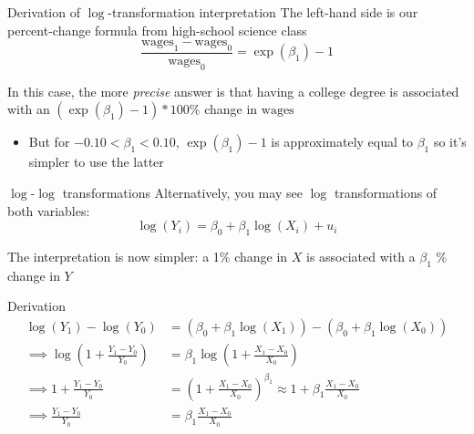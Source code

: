 \documentclass[aspectratio=169,t,11pt,table]{beamer}
\begin{document}
\begin{frame}{Derivation of $\log$-transformation interpretation}
  The left-hand side is our percent-change formula from high-school science class
  $$
    \frac{\text{wages}_1 - \text{wages}_0}{\text{wages}_0} = \exp(\beta_1) - 1
  $$

  \pause
  \bigskip
  In this case, the more \emph{precise} answer is that having a college degree is associated with an $(\exp(\beta_1) - 1) * 100 \%$ change in $\text{wages}$
  \begin{itemize}
    \item But for $-0.10 < \beta_1 < 0.10$, $\exp(\beta_1) - 1$ is approximately equal to $\beta_1$ so it's simpler to use the latter
  \end{itemize}
\end{frame}






\begin{frame}{$\log$-$\log$ transformations}
  Alternatively, you may see $\log$ transformations of both variables:
  $$
    \log(Y_i) = \beta_0 + \beta_1 \log(X_i) + u_i
  $$

  \bigskip
  The interpretation is now simpler: a 1\% change in $X$ is associated with a $\beta_1$ \% change in $Y$
\end{frame}


\begin{frame}{Derivation}
  \vspace*{-1.5\bigskipamount}
  \begin{align*}
    \log(Y_1) - \log(Y_0) &= 
    \left( \beta_0 + \beta_1 \log(X_1) \right) - \left( \beta_0 + \beta_1 \log(X_0) \right) \\[1.5em]
    \implies \log(1 + \frac{Y_1 - Y_0}{Y_0}) &= 
    \beta_1 \log(1 + \frac{X_1 - X_0}{X_0}) \\[1.5em]
    \implies 1 + \frac{Y_1 - Y_0}{Y_0} &= 
    \left( 1 + \frac{X_1 - X_0}{X_0} \right)^{\beta_1} 
    \approx 1 + \beta_1 \frac{X_1 - X_0}{X_0} \\[1.5em]
    \implies \frac{Y_1 - Y_0}{Y_0} &= \beta_1 \frac{X_1 - X_0}{X_0}
  \end{align*}

\end{frame}
\end{document}

